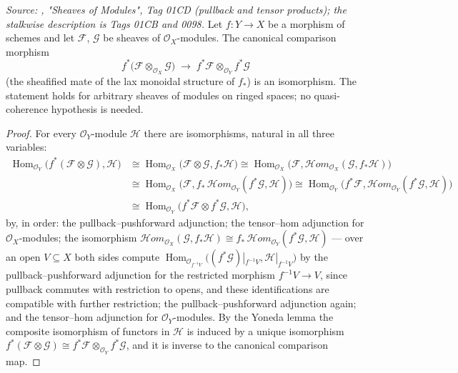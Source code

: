 \begin{lemma}\label{mk-lem:pullback_tensor_map_isiso}
  \leanok

  \textit{Source: \cite{stacks-project}, "Sheaves of Modules", Tag 01CD (pullback
  and tensor products); the stalkwise description is Tags 01CB and 0098.}
  Let \(f : Y \to X\) be a morphism of schemes and let \(\mathcal{F}\),
  \(\mathcal{G}\) be sheaves of \(\mathcal{O}_X\)-modules.  The canonical
  comparison morphism
  \[
    f^*\bigl(\mathcal{F} \otimes_{\mathcal{O}_X} \mathcal{G}\bigr)
    \;\longrightarrow\;
    f^*\mathcal{F} \otimes_{\mathcal{O}_Y} f^*\mathcal{G}
  \]
  (the sheafified mate of the lax monoidal structure of \(f_*\)) is an
  isomorphism.  The statement holds for arbitrary sheaves of modules on
  ringed spaces; no quasi-coherence hypothesis is needed.
\end{lemma}
\begin{proof}
  For every \(\mathcal{O}_Y\)-module \(\mathcal{H}\) there are isomorphisms,
  natural in all three variables:
  \begin{align*}
    \operatorname{Hom}_{\mathcal{O}_Y}\!\bigl(f^*(\mathcal{F} \otimes
      \mathcal{G}), \mathcal{H}\bigr)
    &\cong \operatorname{Hom}_{\mathcal{O}_X}\!\bigl(\mathcal{F} \otimes
      \mathcal{G}, f_*\mathcal{H}\bigr)
    \cong \operatorname{Hom}_{\mathcal{O}_X}\!\bigl(\mathcal{F},
      \mathcal{H}om_{\mathcal{O}_X}(\mathcal{G}, f_*\mathcal{H})\bigr) \\
    &\cong \operatorname{Hom}_{\mathcal{O}_X}\!\bigl(\mathcal{F},
      f_*\,\mathcal{H}om_{\mathcal{O}_Y}(f^*\mathcal{G}, \mathcal{H})\bigr)
    \cong \operatorname{Hom}_{\mathcal{O}_Y}\!\bigl(f^*\mathcal{F},
      \mathcal{H}om_{\mathcal{O}_Y}(f^*\mathcal{G}, \mathcal{H})\bigr) \\
    &\cong \operatorname{Hom}_{\mathcal{O}_Y}\!\bigl(f^*\mathcal{F} \otimes
      f^*\mathcal{G}, \mathcal{H}\bigr),
  \end{align*}
  by, in order: the pullback--pushforward adjunction; the tensor--hom
  adjunction for \(\mathcal{O}_X\)-modules; the isomorphism
  \(\mathcal{H}om_{\mathcal{O}_X}(\mathcal{G}, f_*\mathcal{H}) \cong
  f_*\,\mathcal{H}om_{\mathcal{O}_Y}(f^*\mathcal{G}, \mathcal{H})\) — over
  an open \(V \subseteq X\) both sides compute
  \(\operatorname{Hom}_{\mathcal{O}_{f^{-1}V}}\bigl((f^*\mathcal{G})|_{f^{-1}V},
  \mathcal{H}|_{f^{-1}V}\bigr)\) by the pullback--pushforward adjunction for
  the restricted morphism \(f^{-1}V \to V\), since pullback commutes with
  restriction to opens, and these identifications are compatible with
  further restriction; the pullback--pushforward adjunction again; and the
  tensor--hom adjunction for \(\mathcal{O}_Y\)-modules.  By the Yoneda lemma
  the composite isomorphism of functors in \(\mathcal{H}\) is induced by a
  unique isomorphism \(f^*(\mathcal{F} \otimes \mathcal{G}) \cong
  f^*\mathcal{F} \otimes_{\mathcal{O}_Y} f^*\mathcal{G}\), and it is inverse
  to the canonical comparison map.
\end{proof}


